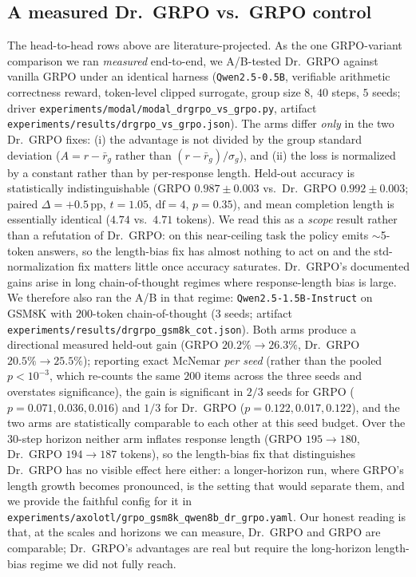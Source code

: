 \subsection{A measured Dr.\ GRPO vs.\ GRPO control}
\label{sec:variance-drgrpo}

The head-to-head rows above are literature-projected. As the one GRPO-variant
comparison we ran \emph{measured} end-to-end, we A/B-tested Dr.\ GRPO
\citep{tong2025drgrpo} against vanilla GRPO under an identical harness
(\texttt{Qwen2.5-0.5B}, verifiable arithmetic correctness reward, token-level
clipped surrogate, group size $8$, $40$ steps, $5$ seeds; driver
\texttt{experiments/modal/modal\_drgrpo\_vs\_grpo.py}, artifact
\texttt{experiments/results/drgrpo\_vs\_grpo.json}). The arms differ \emph{only}
in the two Dr.\ GRPO fixes: (i) the advantage is not divided by the group
standard deviation ($A = r - \bar r_g$ rather than $(r - \bar r_g)/\sigma_g$),
and (ii) the loss is normalized by a constant rather than by per-response
length. Held-out accuracy is statistically indistinguishable (GRPO
$0.987 \pm 0.003$ vs.\ Dr.\ GRPO $0.992 \pm 0.003$; paired
$\Delta = +0.5$\,pp, $t = 1.05$, $\mathrm{df}=4$, $p = 0.35$), and mean
completion length is essentially identical ($4.74$ vs.\ $4.71$ tokens).
We read this as a \emph{scope} result rather than a refutation of Dr.\ GRPO: on
this near-ceiling task the policy emits $\sim$5-token answers, so the
length-bias fix has almost nothing to act on and the std-normalization fix
matters little once accuracy saturates. Dr.\ GRPO's documented gains arise in
long chain-of-thought regimes where response-length bias is large. We therefore
also ran the A/B in that regime: \texttt{Qwen2.5-1.5B-Instruct} on GSM8K with
$200$-token chain-of-thought ($3$ seeds; artifact
\texttt{experiments/results/drgrpo\_gsm8k\_cot.json}). Both arms produce a
directional measured held-out gain (GRPO $20.2\% \to 26.3\%$, Dr.\ GRPO
$20.5\% \to 25.5\%$); reporting exact McNemar \emph{per seed} (rather than the
pooled $p<10^{-3}$, which re-counts the same $200$ items across the three seeds
and overstates significance), the gain is significant in $2/3$ seeds for GRPO
($p=0.071,0.036,0.016$) and $1/3$ for Dr.\ GRPO ($p=0.122,0.017,0.122$), and the
two arms are statistically comparable to each other at this seed budget. Over the $30$-step
horizon neither arm inflates response length (GRPO $195 \to 180$, Dr.\ GRPO
$194 \to 187$ tokens), so the length-bias fix that distinguishes Dr.\ GRPO has
no visible effect here either: a longer-horizon run, where GRPO's length growth
becomes pronounced, is the setting that would separate them, and we provide the
faithful config for it in
\texttt{experiments/axolotl/grpo\_gsm8k\_qwen8b\_dr\_grpo.yaml}. Our honest
reading is that, at the scales and horizons we can measure, Dr.\ GRPO and GRPO
are comparable; Dr.\ GRPO's advantages are real but require the long-horizon
length-bias regime we did not fully reach.

